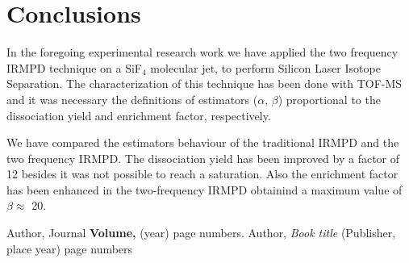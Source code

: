 \documentclass[global,twocolumn]{svjour}
\begin{document}
\section{Conclusions}

In the foregoing experimental research work we have applied the two frequency IRMPD technique on a SiF$_{4}$ molecular jet, to perform Silicon Laser Isotope Separation. The characterization of this technique has been done with TOF-MS and it was necessary the definitions of estimators ($\alpha$, $\beta$) proportional to the dissociation yield and enrichment factor, respectively.

We have compared the estimators behaviour of the traditional IRMPD and the two frequency IRMPD. The dissociation yield has been improved by a factor of 12 besides it was not possible to reach a saturation. Also the enrichment factor has been enhanced in the two-frequency IRMPD obtainind a maximum value of $\beta \approx$ 20.




\begin{thebibliography}{}
	Author, Journal \textbf{Volume,} (year) page numbers.
	Author, \textit{Book title} (Publisher, place year) page numbers
\end{thebibliography}
\end{document}
